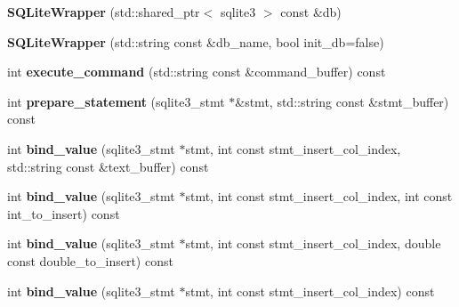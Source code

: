 \begin{DoxyCompactItemize}
\item 
\mbox{\label{class_s_q_lite_wrapper_a9a61e968f7a892ddb9383fa8db001705}} 
{\bfseries S\+Q\+Lite\+Wrapper} (std\+::shared\+\_\+ptr$<$ sqlite3 $>$ const \&db)
\item 
\mbox{\label{class_s_q_lite_wrapper_ae1fce784c6c43a9deea31f68fc2e9966}} 
{\bfseries S\+Q\+Lite\+Wrapper} (std\+::string const \&db\+\_\+name, bool init\+\_\+db=false)
\item 
\mbox{\label{class_s_q_lite_wrapper_affeef069fe57f5340b64cd5dd41a5b51}} 
int {\bfseries execute\+\_\+command} (std\+::string const \&command\+\_\+buffer) const
\item 
\mbox{\label{class_s_q_lite_wrapper_a8635a805eb0012f6ef97335e003d740f}} 
int {\bfseries prepare\+\_\+statement} (sqlite3\+\_\+stmt $\ast$\&stmt, std\+::string const \&stmt\+\_\+buffer) const
\item 
\mbox{\label{class_s_q_lite_wrapper_a8cbdaf79201aabb1a70208cd1264b004}} 
int {\bfseries bind\+\_\+value} (sqlite3\+\_\+stmt $\ast$stmt, int const stmt\+\_\+insert\+\_\+col\+\_\+index, std\+::string const \&text\+\_\+buffer) const
\item 
\mbox{\label{class_s_q_lite_wrapper_a3dd12d5bcf5c795ed14d38835b24c8f5}} 
int {\bfseries bind\+\_\+value} (sqlite3\+\_\+stmt $\ast$stmt, int const stmt\+\_\+insert\+\_\+col\+\_\+index, int const int\+\_\+to\+\_\+insert) const
\item 
\mbox{\label{class_s_q_lite_wrapper_ad76118f495723394edf380cf70e0e381}} 
int {\bfseries bind\+\_\+value} (sqlite3\+\_\+stmt $\ast$stmt, int const stmt\+\_\+insert\+\_\+col\+\_\+index, double const double\+\_\+to\+\_\+insert) const
\item 
\mbox{\label{class_s_q_lite_wrapper_a3bfa48072fccfb0ab7591f240b468112}} 
int {\bfseries bind\+\_\+value} (sqlite3\+\_\+stmt $\ast$stmt, int const stmt\+\_\+insert\+\_\+col\+\_\+index) const
\item 
\mbox{\label{class_s_q_lite_wrapper_a4b6f58f924fae97702115f34ea8abf22}} 

\end{DoxyCompactItemize}

